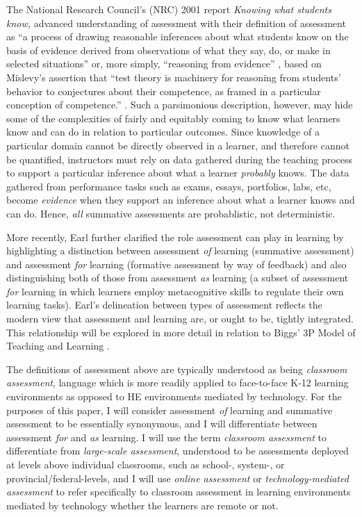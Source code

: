 \documentclass[
]{book}
\begin{document}
The National Research Council's (NRC) 2001 report \emph{Knowing what students know,} advanced understanding of assessment with their definition of assessment as ``a process of drawing reasonable inferences about what students know on the basis of evidence derived from observations of what they say, do, or make in selected situations'' \citep[p.~112]{pellegrinoKnowingWhatStudents2001} or, more simply, ``reasoning from evidence'' \citep[p.~43]{pellegrinoKnowingWhatStudents2001}, based on Mislevy's assertion that ``test theory is machinery for reasoning from students' behavior to conjectures about their competence, as framed in a particular conception of competence.'' \citeyearpar[ p.~4]{mislevyTestTheoryReconcieved1994}. Such a parsimonious description, however, may hide some of the complexities of fairly and equitably coming to know what learners know and can do in relation to particular outcomes. Since knowledge of a particular domain cannot be directly observed in a learner, and therefore cannot be quantified, instructors must rely on data gathered during the teaching process to support a particular inference about what a learner \emph{probably} knows. The data gathered from performance tasks such as exams, essays, portfolios, labs, etc, become \emph{evidence} when they support an inference about what a learner knows and can do. Hence, \emph{all} summative assessments are probablistic, not deterministic.

More recently, Earl \citeyearpar{earlAssessmentLearningUsing2013} further clarified the role assessment can play in learning by highlighting a distinction between assessment \emph{of} learning (summative assessment) and assessment \emph{for} learning (formative assessment by way of feedback) and also distinguishing both of those from assessment \emph{as} learning (a subset of assessment \emph{for} learning in which learners employ metacognitive skills to regulate their own learning tasks). Earl's delineation between types of assessment reflects the modern view that assessment and learning are, or ought to be, tightly integrated. This relationship will be explored in more detail in relation to Biggs' 3P Model of Teaching and Learning \citetext{\citeyear{biggsEnhancingTeachingConstructive1996}; \citeyear{biggsWhatStudentDoes1999}}.

The definitions of assessment above are typically understood as being \emph{classroom assessment}, language which is more readily applied to face-to-face K-12 learning environments as opposed to HE environments mediated by technology. For the purposes of this paper, I will consider assessment \emph{of} learning and summative assessment to be essentially synonymous, and I will differentiate between assessment \emph{for} and \emph{as} learning. I will use the term \emph{classroom assessment} to differentiate from \emph{large-scale assessment}, understood to be assessments deployed at levels above individual classrooms, such as school-, system-, or provincial/federal-levels, and I will use \emph{online assessment} or \emph{technology-mediated assessment} to refer specifically to classroom assessment in learning environments mediated by technology whether the learners are remote or not.
\end{document}
